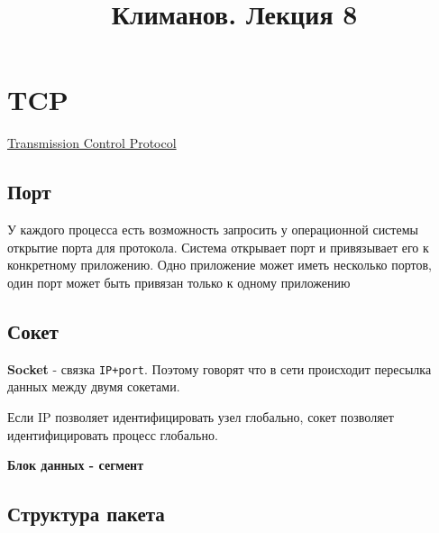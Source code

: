 \documentclass[a4paper,10pt]{article}
\title{Климанов. Лекция 8}
\begin{document}
	\maketitle
	\section{TCP}
	\underline{Transmission Control Protocol}
	
	\subsection{Порт}
	У каждого процесса есть возможность запросить у операционной системы открытие порта для протокола. Система открывает порт и привязывает его к конкретному приложению. Одно приложение может иметь несколько портов, один порт может быть привязан только к одному приложению
	
	\subsection{Сокет}
	\textbf{Socket} - связка \texttt{IP+port}. Поэтому говорят что в сети происходит пересылка данных между двумя сокетами.
	
	Если IP позволяет идентифицировать узел глобально, сокет позволяет идентифицировать процесс глобально. 
	
	\textbf{Блок данных - сегмент}
	\subsection{Структура пакета}
	
\end{document}

